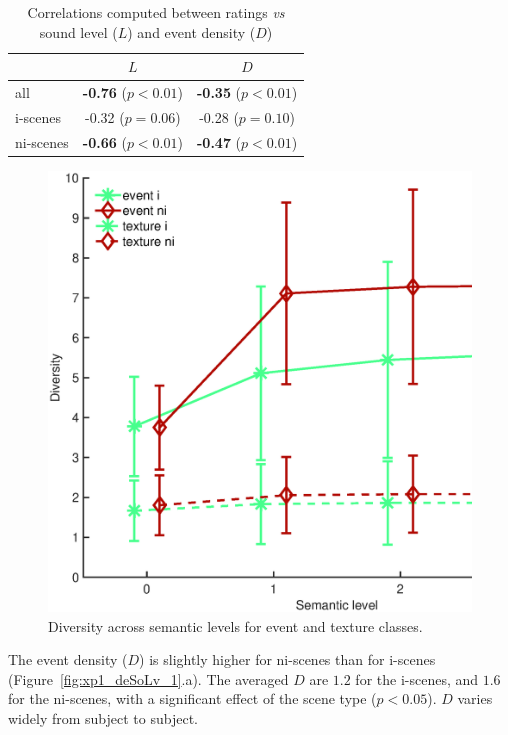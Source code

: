 \documentclass[twoside,twocolumn]{article}
\begin{document}
\begin{table}[t]
\centering
\begin{tabular}{l c c} 
                & $L$                          & $D$    \\
\hline
all             & \textbf{-0.76} ($p<0.01$)    & \textbf{-0.35} ($p<0.01$) \\
i-scenes        & -0.32 ($p=0.06$)             & -0.28 ($p=0.10$) \\
ni-scenes       & \textbf{-0.66} ($p<0.01$)    & \textbf{-0.47} ($p<0.01$) \\

\hline
\end{tabular}
\vspace{0.5mm}
\caption{\label{tab:numGlobal} Correlations computed between ratings \emph{vs} sound level ($L$) and event density ($D$)}
\end{table}

\begin{figure}[t!]
\centering
\includegraphics[width=.4\paperwidth]{../gfxMatlab/xp1_div_1.eps} 
\caption{\label{fig:analyseDensitySnrGlobal3} Diversity across semantic levels for event and texture classes.}
\end{figure}

The event density ($D$) is slightly higher for ni-scenes than for i-scenes (Figure~\ref{fig:xp1_deSoLv_1}.a). The averaged $D$ are $1.2$ for the i-scenes, and $1.6$ for the ni-scenes, with a significant effect of the scene type ($p<0.05$). $D$ varies widely from subject to subject. 
\end{document}
